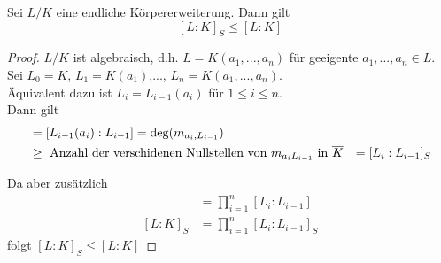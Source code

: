 	\begin{satz}\label{satz:abschSepGrad}
		Sei $L/K$ eine endliche Körpererweiterung. Dann gilt\[[L:K]_S\leq [L:K]\]
	\end{satz}
	\begin{proof}
		$L/K$ ist algebraisch, d.h. $L=K(a_1,...,a_n)$ für geeigente $a_1,...,a_n\in L$.\\
		Sei $L_0=K$, $L_1=K(a_1)$,..., $L_n=K(a_1,...,a_n)$.\\
		Äquivalent dazu ist $L_i=L_{i-1}(a_i)$ für $1\leq i\leq n$.\\
		Dann gilt 
		\begin{align*}
		[L_{i}:L_{i-1}]&=[L_{i-1}(a_i):L_{i-1}]=\deg(m_{a_i,L_{i-1}})\\
		&\geq\text{ Anzahl der verschidenen Nullstellen von $m_{a_iL_{i-1}}$ in $\ol K$}
		&=[L_i:L_{i-1}]_S
		\end{align*}
		
		Da aber zusätzlich
		\begin{align*}
		[L:K]&=\prod_{i=1}^{n}[L_i:L_{i-1}]\\
		[L:K]_S&=\prod_{i=1}^{n}[L_i:L_{i-1}]_S
		\end{align*}
		folgt $[L:K]_S\leq[L:K]$
	\end{proof}

